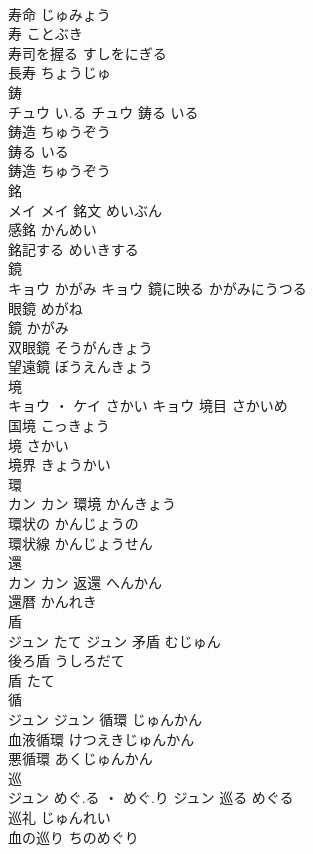\documentclass[8pt]{extreport}
\begin{document}
\begin{CJK}{UTF8}{min}
\\	寿命	じゅみょう	
\\	寿	ことぶき	
\\	寿司を握る	すしをにぎる	
\\	長寿	ちょうじゅ	
\\	鋳	
\\	チュウ	い.る	チュウ	鋳る	いる	
\\	鋳造	ちゅうぞう	
\\	鋳る	いる	
\\	鋳造	ちゅうぞう	
\\	銘	
\\	メイ		メイ	銘文	めいぶん	
\\	感銘	かんめい	
\\	銘記する	めいきする	
\\	鏡	
\\	キョウ	かがみ	キョウ	鏡に映る	かがみにうつる	
\\	眼鏡	めがね	
\\	鏡	かがみ	
\\	双眼鏡	そうがんきょう	
\\	望遠鏡	ぼうえんきょう	
\\	境	
\\	キョウ ・ ケイ	さかい	キョウ	境目	さかいめ	
\\	国境	こっきょう	
\\	境	さかい	
\\	境界	きょうかい	
\\	環	
\\	カン		カン	環境	かんきょう	
\\	環状の	かんじょうの	
\\	環状線	かんじょうせん	
\\	還	
\\	カン		カン	返還	へんかん	
\\	還暦	かんれき	
\\	盾	
\\	ジュン	たて	ジュン	矛盾	むじゅん	
\\	後ろ盾	うしろだて	
\\	盾	たて	
\\	循	
\\	ジュン		ジュン	循環	じゅんかん	
\\	血液循環	けつえきじゅんかん	
\\	悪循環	あくじゅんかん	
\\	巡	
\\	ジュン	めぐ.る ・ めぐ.り	ジュン	巡る	めぐる	
\\	巡礼	じゅんれい	
\\	血の巡り	ちのめぐり	

\end{CJK}
\end{document}
